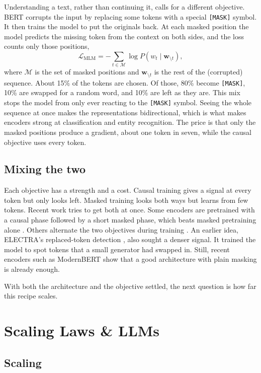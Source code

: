 Understanding a text, rather than continuing it, calls for a different objective.
BERT \citep{devlin_bert_2019} corrupts the input by replacing some tokens with a
special \texttt{[MASK]} symbol. It then trains the model to put the originals back.
At each masked position the model predicts the missing token from the context on
both sides, and the loss counts only those positions,
\[
  \mathcal{L}_{\text{MLM}} = -\sum_{t \in \mathcal{M}} \log P(w_t \mid \mathbf{w}_{\setminus t}),
\]
where $\mathcal{M}$ is the set of masked positions and $\mathbf{w}_{\setminus t}$ is
the rest of the (corrupted) sequence. About 15\% of the tokens are chosen. Of those,
80\% become \texttt{[MASK]}, 10\% are swapped for a random word, and 10\% are left
as they are. This mix stops the model from only ever reacting to the \texttt{[MASK]}
symbol. Seeing the whole sequence at once makes the representations bidirectional,
which is what makes encoders strong at classification and entity recognition. The
price is that only the masked positions produce a gradient, about one token in
seven, while the causal objective uses every token.

\subsection{Mixing the two}

Each objective has a strength and a cost. Causal training gives a signal at every
token but only looks left. Masked training looks both ways but learns from few
tokens. Recent work tries to get both at once. Some encoders are pretrained with a
causal phase followed by a short masked phase, which beats masked pretraining alone
\citep{gisserot2025clm}. Others alternate the two objectives during training
\citep{antlm2024}. An earlier idea, ELECTRA's replaced-token detection \citep{electra},
also sought a denser signal. It trained the model to spot tokens that a small
generator had swapped in. Still, recent encoders such as ModernBERT
\citep{modernbert} show that a good architecture with plain masking is already
enough.

With both the architecture and the objective settled, the next question is how far
this recipe scales.


\section{Scaling Laws \& LLMs}
\label{sec:lm-scaling}

\subsection{Scaling}

